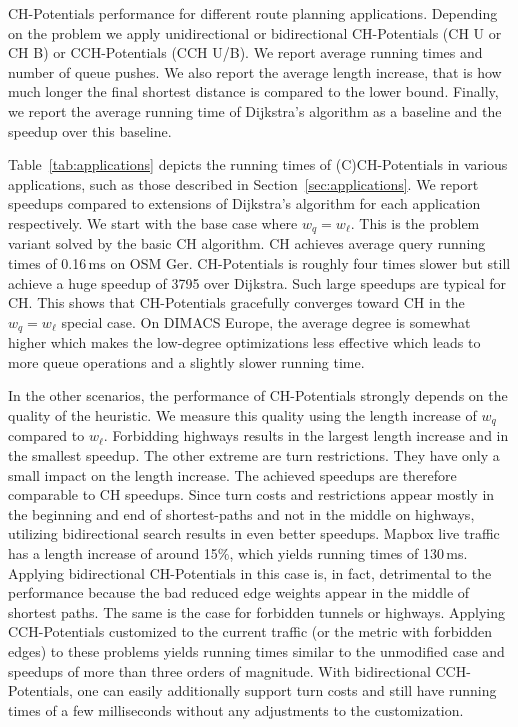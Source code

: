 \documentclass[manuscript,review]{acmart}
\begin{document}
\begin{table}
\centering
\caption{
CH-Potentials performance for different route planning applications.
Depending on the problem we apply unidirectional or bidirectional CH-Potentials (CH U or CH B) or CCH-Potentials (CCH U/B).
We report average running times and number of queue pushes.
We also report the average length increase, that is how much longer the final shortest distance is compared to the lower bound.
Finally, we report the average running time of Dijkstra's algorithm as a baseline and the speedup over this baseline.
}\label{tab:applications}

\end{table}

Table~\ref{tab:applications} depicts the running times of (C)CH-Potentials in various applications, such as those described in Section~\ref{sec:applications}.
We report speedups compared to extensions of Dijkstra's algorithm for each application respectively.
We start with the base case where $w_q = w_\ell$.
This is the problem variant solved by the basic CH algorithm.
CH achieves average query running times of 0.16\,ms on OSM Ger.
CH-Potentials is roughly four times slower but still achieve a huge speedup of 3795 over Dijkstra.
Such large speedups are typical for CH.
This shows that CH-Potentials gracefully converges toward CH in the $w_q = w_\ell$ special case.
On DIMACS Europe, the average degree is somewhat higher which makes the low-degree optimizations less effective which leads to more queue operations and a slightly slower running time.

In the other scenarios, the performance of CH-Potentials strongly depends on the quality of the heuristic.
We measure this quality using the length increase of $w_q$ compared to $w_\ell$.
Forbidding highways results in the largest length increase and in the smallest speedup.
The other extreme are turn restrictions.
They have only a small impact on the length increase.
The achieved speedups are therefore comparable to CH speedups.
Since turn costs and restrictions appear mostly in the beginning and end of shortest-paths and not in the middle on highways, utilizing bidirectional search results in even better speedups.
Mapbox live traffic has a length increase of around 15\%, which yields running times of 130\,ms.
Applying bidirectional CH-Potentials in this case is, in fact, detrimental to the performance because the bad reduced edge weights appear in the middle of shortest paths.
The same is the case for forbidden tunnels or highways.
Applying CCH-Potentials customized to the current traffic (or the metric with forbidden edges) to these problems yields running times similar to the unmodified case and speedups of more than three orders of magnitude.
With bidirectional CCH-Potentials, one can easily additionally support turn costs and still have running times of a few milliseconds without any adjustments to the customization.
\end{document}
